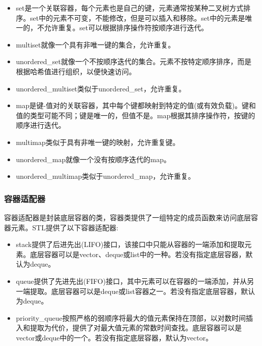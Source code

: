 \begin{itemize}
\item 
set是一个关联容器，每个元素也是自己的键，元素通常按某种二叉树方式排序。set中的元素不可变，不能修改，但是可以插入和移除。set中的元素是唯一的，不允许重复。set可以根据排序操作符按顺序进行迭代。

\item 
multiset就像一个具有非唯一键的集合，允许重复。

\item 
unordered\_set就像一个不按顺序迭代的集合。元素不按特定顺序排序，而是根据哈希值进行组织，以便快速访问。

\item 
unordered\_multiset类似于unordered\_set，允许重复。

\item 
map是键-值对的关联容器，其中每个键都映射到特定的值(或有效负载)。键和值的类型可能不同；键是唯一的，但值不是。map根据其排序操作符，按键的顺序进行迭代。

\item 
multimap类似于具有非唯一键的映射，允许重复键。

\item 
unordered\_map就像一个没有按顺序迭代的map。

\item 
unordered\_multimap类似于unordered\_map，允许重复。
\end{itemize}

\subsubsection{容器适配器}

容器适配器是封装底层容器的类，容器类提供了一组特定的成员函数来访问底层容器元素。STL提供了以下容器适配器:

\begin{itemize}
\item 
stack提供了后进先出(LIFO)接口，该接口中只能从容器的一端添加和提取元素。底层容器可以是vector、deque或list中的一种。若没有指定底层容器，默认为deque。

\item 
queue提供了先进先出(FIFO)接口，其中元素可以在容器的一端添加，并从另一端提取。底层容器可以是deque或list容器之一。若没有指定底层容器，默认为deque。

\item 
priority\_queue按照严格的弱顺序将最大的值元素保持在顶部，以对数时间插入和提取为代价，提供了对最大值元素的常数时间查找。底层容器可以是vector或deque中的一个。若没有指定底层容器，默认为vector。
\end{itemize}

